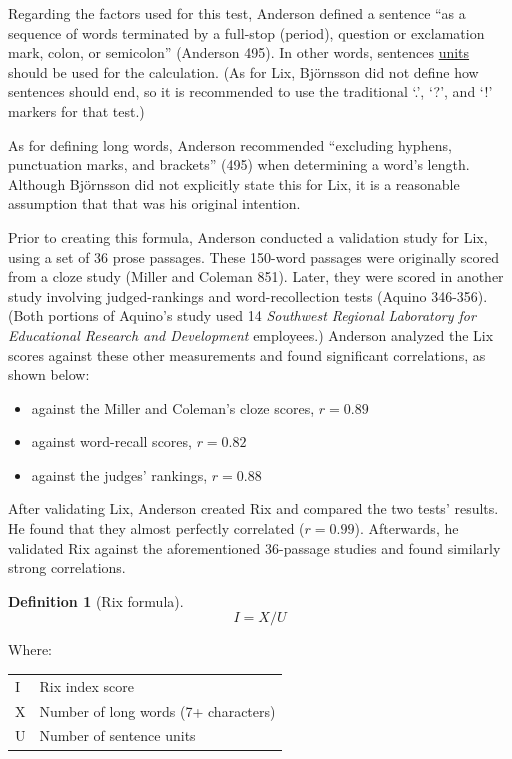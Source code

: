 \documentclass[
]{book}
\providecommand{\tightlist}{%
  \setlength{\itemsep}{0pt}\setlength{\parskip}{0pt}}
\theoremstyle{definition}
\newtheorem{definition}{Definition}[chapter]
\theoremstyle{definition}
\theoremstyle{definition}
\theoremstyle{definition}
\theoremstyle{remark}
\begin{document}
Regarding the factors used for this test, Anderson defined a sentence ``as a sequence of words terminated by a full-stop (period), question or exclamation mark, colon, or semicolon'' (Anderson 495). In other words, sentences \protect\hyperlink{glossary}{units} should be used for the calculation. (As for Lix, Björnsson did not define how sentences should end, so it is recommended to use the traditional `.', `?', and `!' markers for that test.)

As for defining long words, Anderson recommended ``excluding hyphens, punctuation marks, and brackets'' (495) when determining a word's length. Although Björnsson did not explicitly state this for Lix, it is a reasonable assumption that that was his original intention.

Prior to creating this formula, Anderson conducted a validation study for Lix, using a set of 36 prose passages. These 150-word passages were originally scored from a cloze study (Miller and Coleman 851). Later, they were scored in another study involving judged-rankings and word-recollection tests (Aquino 346-356). (Both portions of Aquino's study used 14 \emph{Southwest Regional Laboratory for Educational Research and Development} employees.) Anderson analyzed the Lix scores against these other measurements and found significant correlations, as shown below:

\begin{itemize}
\tightlist
\item
  against the Miller and Coleman's cloze scores, \(r = 0.89\)
\item
  against word-recall scores, \(r = 0.82\)
\item
  against the judges' rankings, \(r = 0.88\)
\end{itemize}

After validating Lix, Anderson created Rix and compared the two tests' results. He found that they almost perfectly correlated (\(r = 0.99\)). Afterwards, he validated Rix against the aforementioned 36-passage studies and found similarly strong correlations.

\newpage

\begin{definition}[Rix formula]
\protect\hypertarget{def:rix}{}{\label{def:rix} {} }\[
I = X/U
\]
\end{definition}

Where:

\begin{longtable}[]{@{}
  >{\raggedright\arraybackslash}p{}
  >{\raggedright\arraybackslash}p{}@{}}
\toprule
\endhead
I & Rix index score \\
X & Number of long words (7+ characters) \\
U & Number of sentence units \\
\bottomrule
\end{longtable}
\end{document}
